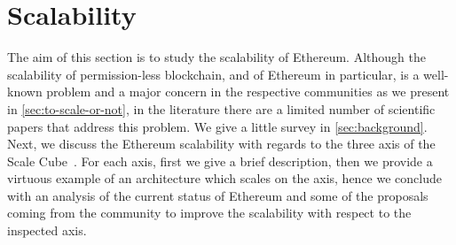 \section{Scalability}
\label{sec:scalability}

The aim of this section is to study the scalability of Ethereum. Although the
scalability of permission-less blockchain, and of Ethereum in particular, is a
well-known problem and a major concern in the respective communities as we
present in \autoref{sec:to-scale-or-not}, in the literature there are a limited
number of scientific papers that address this problem. We give a little survey
in \autoref{sec:background}. Next, we discuss the Ethereum scalability with
regards to the three axis of the Scale Cube~\cite{bib:art-of-scalability}. For
each axis, first we give a brief description, then we provide a virtuous
example of an architecture which scales on the axis, hence we conclude with an
analysis of the current status of Ethereum and some of the proposals coming
from the community to improve the scalability with respect to the inspected
axis.
